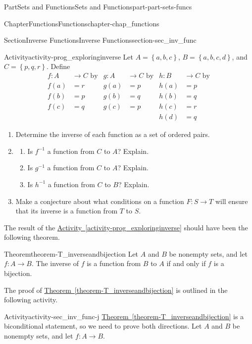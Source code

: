 \documentclass[oneside,10pt,]{book}
\newcommand{\xreffont}{\relax}
\numberwithin{equation}{chapter}
\newcommand{\amp}{&}
\begin{document}
\begin{partptx}{Part}{Sets and Functions}{}{Sets and Functions}{}{}{part-part-sets-funcs}
\begin{chapterptx}{Chapter}{Functions}{}{Functions}{}{}{chapter-chap_functions}
\begin{sectionptx}{Section}{Inverse Functions}{}{Inverse Functions}{}{}{section-sec_inv_func}
\begin{activity}{Activity}{}{activity-prog_exploringinverse}%
Let \(A = \left\{ {a, b, c} \right\}\), \(B = \left\{ {a,b,c,d} \right\}\), and \(C = \left\{ {p, q, r} \right\}\). Define%
\begin{align*}
f: A \amp \to C \text{ by} \amp g: A \amp \to C \text{ by} \amp h: B \amp \to C \text{ by}\\
f( a ) \amp = r \amp g( a ) \amp = p \amp h( a ) \amp = p\\
f( b ) \amp = p \amp g( b ) \amp = q \amp h( b ) \amp = q\\
f( c ) \amp = q \amp g( c ) \amp = p \amp h( c ) \amp = r\\
\amp \amp \amp \amp h ( d ) \amp = q
\end{align*}
%
\begin{enumerate}[font=\bfseries,label=(\alph*),ref=\alph*]%
\item{}Determine the inverse of each function as a set of ordered pairs.%
\item{}\begin{enumerate}[font=\bfseries,label=(\roman*),ref=\theenumi.\roman*]%
\item{}Is \(f^{ - 1}\) a function from \(C\) to \(A\)? Explain.%
\item{}Is \(g^{ - 1}\) a function from \(C\) to \(A\)? Explain.%
\item{}Is \(h^{ - 1}\) a function from \(C\) to \(B\)? Explain.%
\end{enumerate}%
\item\label{task-A_exploringinverse3}Make a conjecture about what conditions on a function \(F: S \to T\) will ensure that its inverse is a function from \(T\) to \(S\).%
\end{enumerate}%
\end{activity}%
The result of the \hyperref[activity-prog_exploringinverse]{Activity~{\xreffont\ref{activity-prog_exploringinverse}}} should have been the following theorem.%
\begin{theorem}{Theorem}{}{}{theorem-T_inverseandbijection}%
Let \(A\) and \(B\) be nonempty sets, and let \(f: A \to B\). The inverse of \(f\) is a function from \(B\) to \(A\) if and only if \(f\) is a bijection.%
\end{theorem}
The proof of \hyperref[theorem-T_inverseandbijection]{Theorem~{\xreffont\ref{theorem-T_inverseandbijection}}} is outlined in the following activity.%
\begin{activity}{Activity}{}{activity-sec_inv_func-j}%
\hyperref[theorem-T_inverseandbijection]{Theorem~{\xreffont\ref{theorem-T_inverseandbijection}}} is a biconditional statement, so we need to prove both directions. Let \(A\) and \(B\) be nonempty sets, and let \(f: A \to B\).%

\end{activity}
\end{sectionptx}
\end{chapterptx}
\end{partptx}
\end{document}
